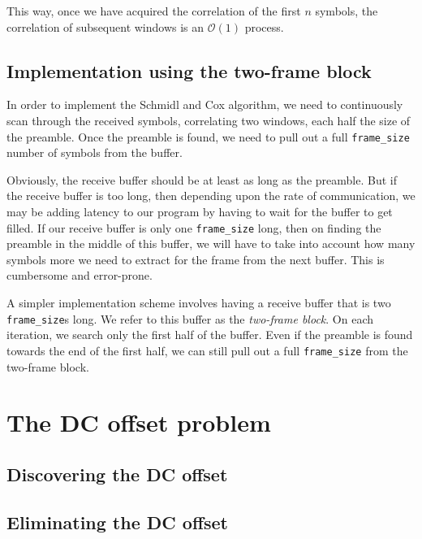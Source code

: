 This way, once we have acquired the correlation of the first $n$ symbols, the
correlation of subsequent windows is an $\mathcal{O}(1)$ process.

\subsection{Implementation using the two-frame block}
\label{subsec:two-frame-impl}

In order to implement the Schmidl and Cox algorithm, we need to continuously
scan through the received symbols, correlating two windows, each half the size
of the preamble. Once the preamble is found, we need to pull out a full
\verb+frame_size+ number of symbols from the buffer.

Obviously, the receive buffer should be at least as long as the preamble. But
if the receive buffer is too long, then depending upon the rate of
communication, we may be adding latency to our program by having to wait for
the buffer to get filled. If our receive buffer is only one \verb+frame_size+
long, then on finding the preamble in the middle of this buffer, we will have
to take into account how many symbols more we need to extract for the frame
from the next buffer. This is cumbersome and error-prone.

A simpler implementation scheme involves having a receive buffer that is two
\verb+frame_size+s long. We refer to this buffer as the \emph{two-frame block}.
On each iteration, we search only the first half of the buffer. Even if the
preamble is found towards the end of the first half, we can still pull out a
full \verb+frame_size+ from the two-frame block.



\section{The DC offset problem}

\subsection{Discovering the DC offset}
\subsection{Eliminating the DC offset}

